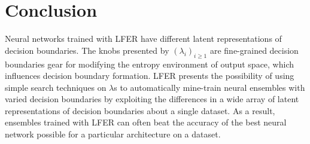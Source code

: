 \documentclass[journal]{journal}
\begin{document}
\section{Conclusion}
Neural networks trained with LFER have different latent representations of decision boundaries. The knobs presented by $(\lambda_{i})_{i \geq 1}$ are fine-grained decision boundaries gear for modifying the entropy environment of output space, which influences decision boundary formation. LFER presents the possibility of using simple search techniques on $\lambda$s to automatically mine-train neural ensembles with varied decision boundaries by exploiting the differences in a wide array of latent representations of decision boundaries about a single dataset. As a result, ensembles trained with LFER can often beat the accuracy of the best neural network possible for a particular architecture on a dataset.



%


\ifCLASSOPTIONcaptionsoff
  \newpage
\fi



\end{document}
